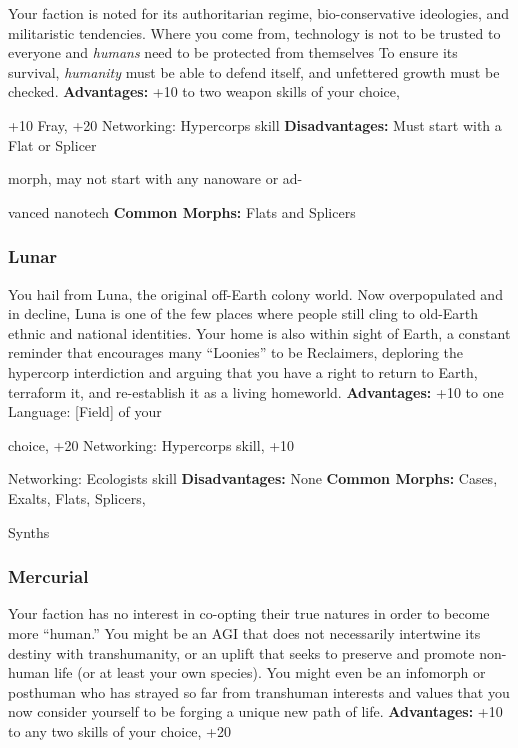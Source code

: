 Your faction is noted for its authoritarian regime, bio-conservative
ideologies, and militaristic tendencies.
Where you come from, technology is not to be trusted to 
everyone and \textit{humans} need to be protected from themselves
To ensure its survival, \textit{humanity }must be able to
defend itself, and unfettered growth must be checked.
\textbf{Advantages:} +10 to two weapon skills of your choice, 

+10 Fray, +20 Networking: Hypercorps skill
\textbf{Disadvantages:} Must start with a Flat or Splicer 

morph, may not start with any nanoware or ad-

vanced nanotech
\textbf{Common Morphs:} Flats and Splicers

\subsubsection{Lunar}

You hail from Luna, the original off-Earth colony 
world. Now overpopulated and in decline, Luna is 
one of the few places where people still cling to old-Earth
ethnic and national identities. Your home is also
within sight of Earth, a constant reminder that encourages
many ``Loonies'' to be Reclaimers, deploring the
hypercorp interdiction and arguing that you have a 
right to return to Earth, terraform it, and re-establish 
it as a living homeworld.
\textbf{Advantages:} +10 to one Language: [Field] of your 

choice, +20 Networking: Hypercorps skill, +10 

Networking: Ecologists skill
\textbf{Disadvantages:} None
\textbf{Common Morphs:} Cases, Exalts, Flats, Splicers, 

Synths

\subsubsection{Mercurial}

Your faction has no interest in co-opting their true 
natures in order to become more ``human.'' You might 
be an AGI that does not necessarily intertwine its 
destiny with transhumanity, or an uplift that seeks 
to preserve and promote non-human life (or at least 
your own species). You might even be an infomorph or 
posthuman who has strayed so far from transhuman 
interests and values that you now consider yourself to 
be forging a unique new path of life.
\textbf{Advantages:} +10 to any two skills of your choice, +20 

